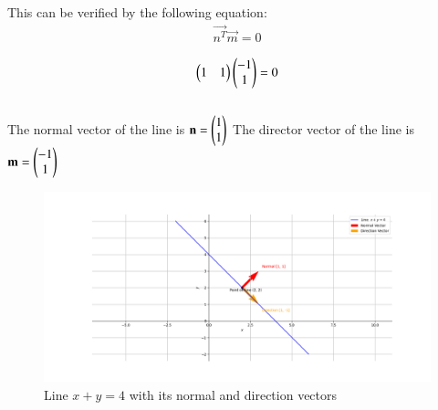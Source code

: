 \documentclass[journal]{IEEEtran}
\begin{document}
This can be verified by the following equation:
\begin{align}
\vec{n^T}\vec{m} = 0
\end{align}

\begin{align}
\begin{pmatrix}1 & 1\end{pmatrix}\begin{pmatrix}-1 \\ 1\end{pmatrix} = 0
\end{align}\\



The normal vector of the line is $\mathbf{n} = \begin{pmatrix}1 \\ 1\end{pmatrix}$
The director vector of the line is $\mathbf{m} = \begin{pmatrix}-1 \\ 1\end{pmatrix}$\\

\begin{figure}[H]
    \centering
    \includegraphics[width=1.1\columnwidth]{figs/fig6.png}
    \caption{Line $x + y = 4$ with its normal and direction vectors}
    \label{fig:placeholder}
\end{figure}
\end{document}
